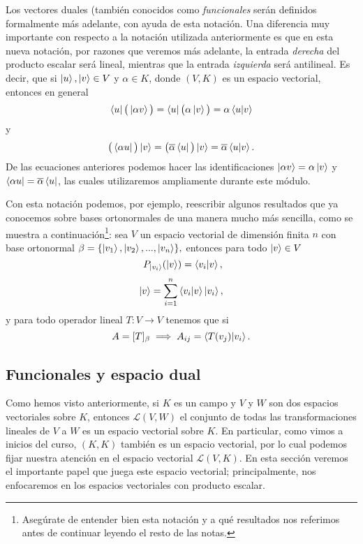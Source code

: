 \documentclass[12pt,libertine]{book}
\begin{document}
\noindent Los vectores duales (también conocidos como \emph{funcionales} serán definidos formalmente más adelante, con ayuda de esta notación. Una diferencia muy importante con respecto a la notación utilizada anteriormente es que en esta nueva notación, por razones que veremos más adelante, la entrada \emph{derecha} del producto escalar será lineal, mientras que la entrada \emph{izquierda} será antilineal. Es decir, que si $\ket{u},\ket{v}\in V$ y $\alpha\in K$, donde $(V,K)$ es un espacio vectorial, entonces en general \[
    \bra{u}\big (\ket{\alpha v}\big ) = \bra{u}\big(\alpha\ket{v}\big) = \alpha\braket{u|v}
\] \noindent y \[
\big (\bra{\alpha u}\big ) \ket{v} = \big( \overline{\alpha}\bra{u}\big)\ket{v}  = \overline{\alpha}\braket{u|v}.
\] De las ecuaciones anteriores podemos hacer las identificaciones $\ket{\alpha v}=\alpha\ket{v}$ y $\bra{\alpha u}= \overline{\alpha}\bra{u}$, las cuales utilizaremos ampliamente durante este módulo. 

Con esta notación podemos, por ejemplo, reescribir algunos resultados que ya conocemos sobre bases ortonormales de una manera mucho más sencilla, como se muestra a continuación\footnote{Asegúrate de entender bien esta notación y a qué resultados nos referimos antes de continuar leyendo el resto de las notas.}: sea $V$ un espacio vectorial de dimensión finita $n$ con base ortonormal $\beta=\{\ket{v_1},\ket{v_2},...,\ket{v_n}\},$ entonces para todo $\ket{v}\in V$ \[\ P_{\ket{v_i}}(\ket{v})=\braket{v_i|v},\] \[\ket{v}=\sum_{i=1}^n \braket{v_i|v}\ket{v_i},
\] \noindent y para todo operador lineal $T:V\to V$ tenemos que si \[A=[T]_{\beta} \implies A_{ij}=\braket{T(v_j)|v_i}
.\] 

\newpage
\subsection*{Funcionales y espacio dual} \label{Subsec:Funcionales_y_espacio_dual} 

Como hemos visto anteriormente, si $K$ es un campo y $V$ y $W$ son dos espacios vectoriales sobre $K$, entonces $\mathcal{L}(V,W)$ \textemdash el conjunto de todas las transformaciones lineales de $V$ a $W$\textemdash\hspace{0.5mm} es un espacio vectorial sobre $K$. En particular, como vimos a inicios del curso, $(K,K)$ también es un espacio vectorial, por lo cual podemos fijar nuestra atención en el espacio vectorial $\mathcal{L}(V,K)$. En esta sección veremos el importante papel que juega este espacio vectorial; principalmente, nos enfocaremos en los espacios vectoriales con producto escalar.
\end{document}
